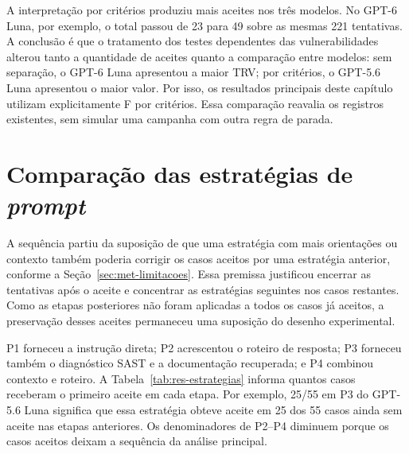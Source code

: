 A interpretação por critérios produziu mais aceites nos três modelos. No GPT-6 Luna, por exemplo, o total passou de 23 para 49 sobre as mesmas 221 tentativas. A conclusão é que o tratamento dos testes dependentes das vulnerabilidades alterou tanto a quantidade de aceites quanto a comparação entre modelos: sem separação, o GPT-6 Luna apresentou a maior TRV; por critérios, o GPT-5.6 Luna apresentou o maior valor. Por isso, os resultados principais deste capítulo utilizam explicitamente F por critérios. Essa comparação reavalia os registros existentes, sem simular uma campanha com outra regra de parada.

\section{Comparação das estratégias de \textit{prompt}}

\label{sec:res-estrategias}

A sequência partiu da suposição de que uma estratégia com mais orientações ou contexto também poderia corrigir os casos aceitos por uma estratégia anterior, conforme a Seção~\ref{sec:met-limitacoes}. Essa premissa justificou encerrar as tentativas após o aceite e concentrar as estratégias seguintes nos casos restantes. Como as etapas posteriores não foram aplicadas a todos os casos já aceitos, a preservação desses aceites permaneceu uma suposição do desenho experimental.

P1 forneceu a instrução direta; P2 acrescentou o roteiro de resposta; P3 forneceu também o diagnóstico SAST e a documentação recuperada; e P4 combinou contexto e roteiro. A Tabela~\ref{tab:res-estrategias} informa quantos casos receberam o primeiro aceite em cada etapa. Por exemplo, 25/55 em P3 do GPT-5.6 Luna significa que essa estratégia obteve aceite em 25 dos 55 casos ainda sem aceite nas etapas anteriores. Os denominadores de P2--P4 diminuem porque os casos aceitos deixam a sequência da análise principal.

